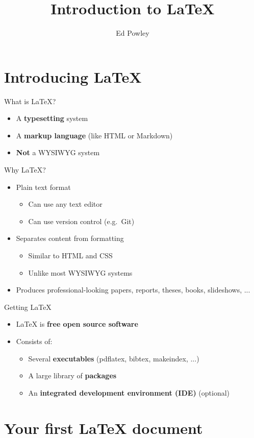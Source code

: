 \documentclass[xcolor={dvipsnames}]{beamer}
\title{Introduction to LaTeX}
\author{Ed Powley}
\begin{document}
\frame{\maketitle}

\part{Introducing LaTeX}
\frame{\partpage}

\begin{frame}{What is LaTeX?}
\begin{itemize}
	\pause\item A \textbf{typesetting} system
	\pause\item A \textbf{markup language} (like HTML or Markdown)
	\pause\item \textbf{Not} a WYSIWYG system
\end{itemize}
\end{frame}

\begin{frame}{Why LaTeX?}
\begin{itemize}
	\pause\item Plain text format
	\begin{itemize}
		\pause\item Can use any text editor
		\pause\item Can use version control (e.g.\ Git)
	\end{itemize}
	\pause\item Separates content from formatting
	\begin{itemize}
		\pause\item Similar to HTML and CSS
		\pause\item Unlike most WYSIWYG systems
	\end{itemize}
	\pause\item Produces professional-looking papers, reports, theses, books, slideshows, ...
\end{itemize}
\end{frame}

\begin{frame}{Getting LaTeX}
\begin{itemize}
	\pause\item LaTeX is \textbf{free open source software}
	\pause\item Consists of:
	\begin{itemize}
		\pause\item Several \textbf{executables} (pdflatex, bibtex, makeindex, ...)
		\pause\item A large library of \textbf{packages}
		\pause\item An \textbf{integrated development environment (IDE)} (optional)
	\end{itemize}
\end{itemize}
\end{frame}

\part{Your first LaTeX document}
\frame{\partpage}
\end{document}
